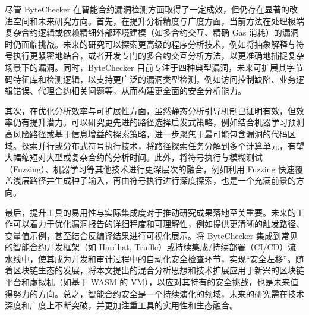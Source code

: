 \documentclass[print, master, vlined, timesmath]{DissertUESTC}
\begin{document}
尽管 ByteChecker 在智能合约漏洞检测方面取得了一定成效，但仍存在显著的改进空间和未来研究方向。首先，在提升分析精度与广度方面，当前方法在处理极端复杂合约逻辑或依赖精细外部环境建模（如多合约交互、精确 Gas 消耗）的漏洞时仍面临挑战。未来的研究可以探索更高级的程序分析技术，例如将抽象解释与符号执行更紧密地结合，或者开发专门的多合约交互分析方法，以更准确地捕捉复杂场景下的漏洞。同时，ByteChecker 目前专注于四种典型漏洞，未来可扩展其字节码特征库和检测逻辑，以支持更广泛的漏洞类型检测，例如访问控制缺陷、业务逻辑错误、代理合约相关问题等，从而构建更全面的安全分析能力。

其次，在优化分析效率与可扩展性方面，虽然静态分析引导机制已证明有效，但效率仍有提升潜力。可以研究更先进的路径选择启发式策略，例如结合机器学习预测高风险路径或基于信息增益的探索策略，进一步聚焦于最可能包含漏洞的代码区域。探索并行或分布式符号执行技术，将路径探索任务分解到多个计算单元，有望大幅缩短对大型或复杂合约的分析时间。此外，将符号执行与模糊测试（Fuzzing）、机器学习等其他技术进行更深层次的融合，例如利用 Fuzzing 快速覆盖浅层路径并生成种子输入，再由符号执行进行深度探索，也是一个充满前景的方向。

最后，提升工具的易用性与实际集成度对于推动研究成果落地至关重要。未来的工作可以着力于优化漏洞报告的详细程度和可理解性，例如提供更清晰的触发路径、变量值示例，甚至结合反编译结果进行可视化展示。将 ByteChecker 集成到常见的智能合约开发框架（如 Hardhat, Truffle）或持续集成/持续部署（CI/CD）流水线中，使其成为开发和审计过程中的自动化安全检查环节，实现“安全左移”。随着区块链生态的发展，将本文提出的混合分析思想和技术扩展应用于新兴的区块链平台和虚拟机（如基于 WASM 的 VM），以应对其特有的安全挑战，也是未来值得努力的方向。总之，智能合约安全是一个持续演化的领域，未来的研究需在技术深度和广度上不断突破，并更加注重工具的实用性和生态融合。
\end{document}
